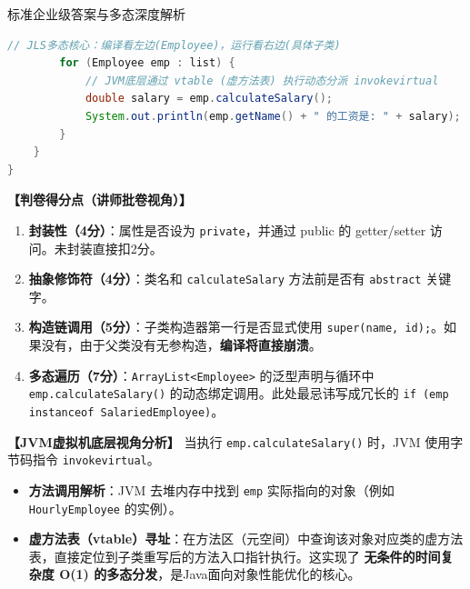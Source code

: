 \documentclass[12pt, a4paper]{ctexart}
\begin{document}
\begin{bluebox}{标准企业级答案与多态深度解析}
\begin{lstlisting}[language=Java]
        // JLS多态核心：编译看左边(Employee)，运行看右边(具体子类)
        for (Employee emp : list) {
            // JVM底层通过 vtable (虚方法表) 执行动态分派 invokevirtual
            double salary = emp.calculateSalary(); 
            System.out.println(emp.getName() + " 的工资是: " + salary);
        }
    }
}
\end{lstlisting}

	\textbf{【判卷得分点（讲师批卷视角）】}
	\begin{enumerate}[leftmargin=*, nosep]
		\item \textbf{封装性（4分）}：属性是否设为 \texttt{private}，并通过 public 的 getter/setter 访问。未封装直接扣2分。
		\item \textbf{抽象修饰符（4分）}：类名和 \texttt{calculateSalary} 方法前是否有 \texttt{abstract} 关键字。
		\item \textbf{构造链调用（5分）}：子类构造器第一行是否显式使用 \texttt{super(name, id);}。如果没有，由于父类没有无参构造，\textbf{编译将直接崩溃}。
		\item \textbf{多态遍历（7分）}：\texttt{ArrayList<Employee>} 的泛型声明与循环中 \texttt{emp.calculateSalary()} 的动态绑定调用。此处最忌讳写成冗长的 \texttt{if (emp instanceof SalariedEmployee)}。
	\end{enumerate}

	\textbf{【JVM虚拟机底层视角分析】}
	当执行 \texttt{emp.calculateSalary()} 时，JVM 使用字节码指令 \texttt{invokevirtual}。
	\begin{itemize}
		\item \textbf{方法调用解析}：JVM 去堆内存中找到 \texttt{emp} 实际指向的对象（例如 \texttt{HourlyEmployee} 的实例）。
		\item \textbf{虚方法表（vtable）寻址}：在方法区（元空间）中查询该对象对应类的虚方法表，直接定位到子类重写后的方法入口指针执行。这实现了 \textbf{无条件的时间复杂度 O(1) 的多态分发}，是Java面向对象性能优化的核心。
	\end{itemize}
\end{bluebox}
\end{document}
